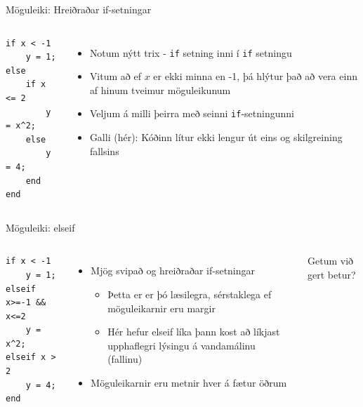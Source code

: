 \documentclass{beamer}
\begin{document}
\begin{frame}[fragile]{Möguleiki: Hreiðraðar if-setningar}
\begin{columns}
\begin{verbatim}
if x < -1
    y = 1;
else
    if x <= 2
        y = x^2;
    else
        y = 4;
    end
end
\end{verbatim}
\begin{itemize}
 \item Notum nýtt trix - \texttt{if} setning inni í \texttt{if} setningu
 \item Vitum að ef $x$ er ekki minna en -1, þá hlýtur það að vera einn af hinum tveimur möguleikunum
 \item Veljum á milli þeirra með seinni \texttt{if}-setningunni
 \item Galli (hér): Kóðinn lítur ekki lengur út eins og skilgreining fallsins
\end{itemize}
\end{columns}
\end{frame}

\begin{frame}[fragile]{Möguleiki: elseif}
\begin{columns}
\begin{verbatim}
if x < -1
    y = 1;
elseif x>=-1 && x<=2
    y = x^2;
elseif x > 2
    y = 4;
end
\end{verbatim}
\begin{itemize}
 \item Mjög svipað og hreiðraðar if-setningar
 \begin{itemize}
  \item Þetta er er þó læsilegra, sérstaklega ef möguleikarnir eru margir
  \item Hér hefur elseif líka þann kost að líkjast upphaflegri lýsingu á vandamálinu (fallinu)
 \end{itemize}
 \item Möguleikarnir eru metnir hver á fætur öðrum
\end{itemize}
Getum við gert betur?
\end{columns}
\end{frame}
\end{document}
